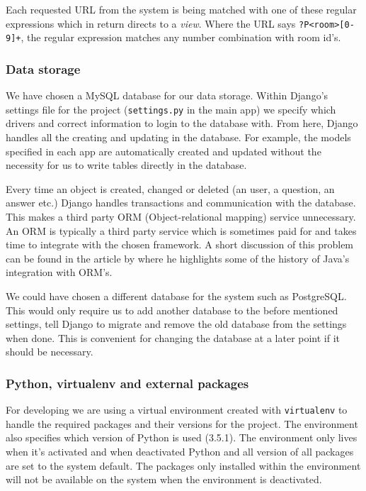 Each requested URL from the system is being matched with one of these regular expressions which in return directs to a \emph{view}. Where the URL says \texttt{?P<room>[0-9]+}, the regular expression matches any number combination with room id's.


\subsubsection{Data storage}
We have chosen a MySQL database for our data storage. Within Django's settings file for the project (\texttt{settings.py} in the main app) we specify which drivers and correct information to login to the database with. From here, Django handles all the creating and updating in the database. For example, the models specified in each app are automatically created and updated without the necessity for us to write tables directly in the database. 

Every time an object is created, changed or deleted (an user, a question, an answer etc.) Django handles transactions and communication with the database. This makes a third party ORM (Object-relational mapping) service unnecessary. An ORM is typically a third party service which is sometimes paid for and takes time to integrate with the chosen framework. A short discussion of this problem can be found in the article by  where he highlights some of the history of Java's integration with ORM's.

We could have chosen a different database for the system such as PostgreSQL. This would only require us to add another database to the before mentioned settings, tell Django to migrate and remove the old database from the settings when done. This is convenient for changing the database at a later point if it should be necessary.


\subsubsection{Python, virtualenv and external packages}
For developing we are using a virtual environment created with \texttt{virtualenv} to handle the required packages and their versions for the project. The environment also specifies which version of Python is used (3.5.1). The environment only lives when it's activated and when deactivated Python and all version of all packages are set to the system default. The packages only installed within the environment will not be available on the system when the environment is deactivated. 

